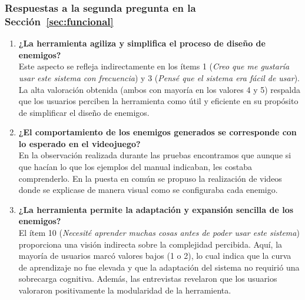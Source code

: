 \subsubsection{Respuestas a la segunda pregunta en la Sección~\ref{sec:funcional}}

\begin{enumerate}
    \item \textbf{¿La herramienta agiliza y simplifica el proceso de diseño de enemigos?} \\

Este aspecto se refleja indirectamente en los ítems 1 (\textit{Creo que me gustaría usar este sistema con frecuencia}) y 3 (\textit{Pensé que el sistema era fácil de usar}). La alta valoración obtenida (ambos con mayoría en los valores 4 y 5) respalda que los usuarios perciben la herramienta como útil y eficiente en su propósito de simplificar el diseño de enemigos.

    \item \textbf{¿El comportamiento de los enemigos generados se corresponde con lo esperado en el videojuego?} \\

En la observación realizada durante las pruebas encontramos que aunque si que hacían lo que los ejemplos del manual indicaban, les costaba comprenderlo. En la puesta en común se propuso la realización de videos donde se explicase de manera visual como se configuraba cada enemigo.

    \item \textbf{¿La herramienta permite la adaptación y expansión sencilla de los enemigos?} \\

El ítem 10 (\textit{Necesité aprender muchas cosas antes de poder usar este sistema}) proporciona una visión indirecta sobre la complejidad percibida. Aquí, la mayoría de usuarios marcó valores bajos (1 o 2), lo cual indica que la curva de aprendizaje no fue elevada y que la adaptación del sistema no requirió una sobrecarga cognitiva. Además, las entrevistas revelaron que los usuarios valoraron positivamente la modularidad de la herramienta.
\end{enumerate}
